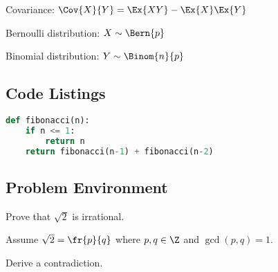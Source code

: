 \documentclass[12pt]{amsart}
\begin{document}
Covariance: $\Cov{X}{Y} = \Ex{XY} - \Ex{X}\Ex{Y}$

Bernoulli distribution: $X \sim \Bern{p}$

Binomial distribution: $Y \sim \Binom{n}{p}$

\subsection{Code Listings}

\begin{lstlisting}[language=Python]
def fibonacci(n):
    if n <= 1:
        return n
    return fibonacci(n-1) + fibonacci(n-2)
\end{lstlisting}

\subsection{Problem Environment}

\begin{problem}
Prove that $\sqrt{2}$ is irrational.
\end{problem}

\begin{subproblem}
Assume $\sqrt{2} = \fr{p}{q}$ where $p, q \in \Z$ and $\gcd(p, q) = 1$.
\end{subproblem}

\begin{subproblem}
Derive a contradiction.
\end{subproblem}
\end{document}

